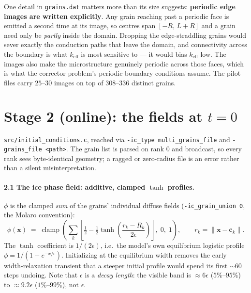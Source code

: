 \documentclass[11pt]{article}
\newcommand{\code}[1]{\texttt{\small #1}}
\begin{document}
One detail in \code{grains.dat} matters more than its size suggests:
\textbf{periodic edge images are written explicitly}. Any grain reaching
past a periodic face is emitted a second time at its image, so centres span
$[-R,\,L+R]$ and a grain need only be \emph{partly} inside the domain.
Dropping the edge-straddling grains would sever exactly the conduction
paths that leave the domain, and connectivity across the boundary is what
$k_{\text{eff}}$ is most sensitive to --- it would bias $k_{\text{eff}}$
low. The images also make the microstructure genuinely periodic across
those faces, which is what the corrector problem's periodic boundary
conditions assume. The pilot files carry $25$--$30$ images on top of
$308$--$336$ distinct grains.

\section{Stage 2 (online): the fields at $t = 0$}
\label{sec:online}

\code{src/initial\_conditions.c}, reached via \code{-ic\_type
multi\_grains\_file} and \code{-grains\_file <path>}. The grain list is
parsed on rank 0 and broadcast, so every rank sees byte-identical geometry;
a ragged or zero-radius file is an error rather than a silent
misinterpretation.

\paragraph{2.1 The ice phase field: additive, clamped $\tanh$ profiles.}
$\phi$ is the clamped \emph{sum} of the grains' individual diffuse fields
(\code{-ic\_grain\_union 0}, the Molaro convention):
%
\begin{equation}
  \phi(\mathbf{x}) \;=\;
  \operatorname{clamp}\!\left(
    \sum_{k}
      \left[\tfrac12 - \tfrac12 \tanh\!\left(\frac{r_k - R_k}{2\epsilon}\right)\right],
    \;0,\;1\right),
  \qquad r_k = \lVert \mathbf{x} - \mathbf{c}_k \rVert .
  \label{eq:phi}
\end{equation}
%
The $\tanh$ coefficient is $1/(2\epsilon)$, i.e.\ the model's own
equilibrium logistic profile $\phi = 1/(1+e^{-x/\epsilon})$. Initializing
at the equilibrium width removes the early width-relaxation transient that
a steeper initial profile would spend its first $\sim 60$ steps undoing.
Note that $\epsilon$ is a \emph{decay length}: the visible band is
$\approx 6\epsilon$ ($5\%$--$95\%$) to $\approx 9.2\epsilon$
($1\%$--$99\%$), not $\epsilon$.
\end{document}
